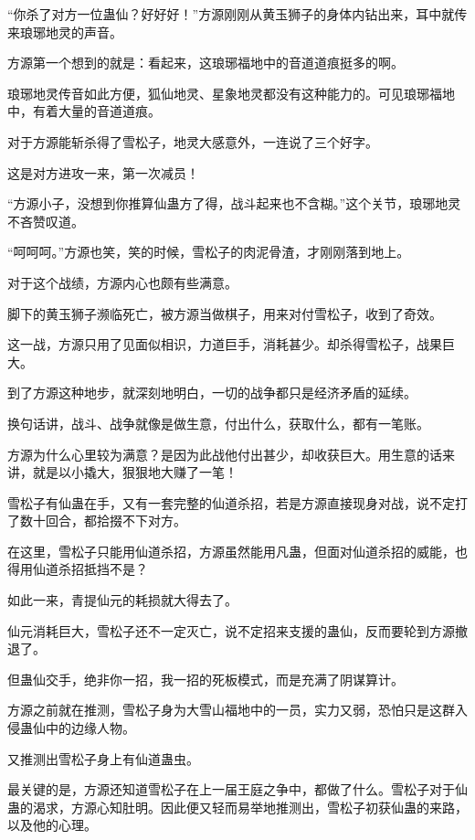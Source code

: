 
\begin{this_body}



“你杀了对方一位蛊仙？好好好！”方源刚刚从黄玉狮子的身体内钻出来，耳中就传来琅琊地灵的声音。

方源第一个想到的就是：看起来，这琅琊福地中的音道道痕挺多的啊。

琅琊地灵传音如此方便，狐仙地灵、星象地灵都没有这种能力的。可见琅琊福地中，有着大量的音道道痕。

对于方源能斩杀得了雪松子，地灵大感意外，一连说了三个好字。

这是对方进攻一来，第一次减员！

“方源小子，没想到你推算仙蛊方了得，战斗起来也不含糊。”这个关节，琅琊地灵不吝赞叹道。

“呵呵呵。”方源也笑，笑的时候，雪松子的肉泥骨渣，才刚刚落到地上。

对于这个战绩，方源内心也颇有些满意。

脚下的黄玉狮子濒临死亡，被方源当做棋子，用来对付雪松子，收到了奇效。

这一战，方源只用了见面似相识，力道巨手，消耗甚少。却杀得雪松子，战果巨大。

到了方源这种地步，就深刻地明白，一切的战争都只是经济矛盾的延续。

换句话讲，战斗、战争就像是做生意，付出什么，获取什么，都有一笔账。

方源为什么心里较为满意？是因为此战他付出甚少，却收获巨大。用生意的话来讲，就是以小撬大，狠狠地大赚了一笔！

雪松子有仙蛊在手，又有一套完整的仙道杀招，若是方源直接现身对战，说不定打了数十回合，都拾掇不下对方。

在这里，雪松子只能用仙道杀招，方源虽然能用凡蛊，但面对仙道杀招的威能，也得用仙道杀招抵挡不是？

如此一来，青提仙元的耗损就大得去了。

仙元消耗巨大，雪松子还不一定灭亡，说不定招来支援的蛊仙，反而要轮到方源撤退了。

但蛊仙交手，绝非你一招，我一招的死板模式，而是充满了阴谋算计。

方源之前就在推测，雪松子身为大雪山福地中的一员，实力又弱，恐怕只是这群入侵蛊仙中的边缘人物。

又推测出雪松子身上有仙道蛊虫。

最关键的是，方源还知道雪松子在上一届王庭之争中，都做了什么。雪松子对于仙蛊的渴求，方源心知肚明。因此便又轻而易举地推测出，雪松子初获仙蛊的来路，以及他的心理。


\end{this_body}

